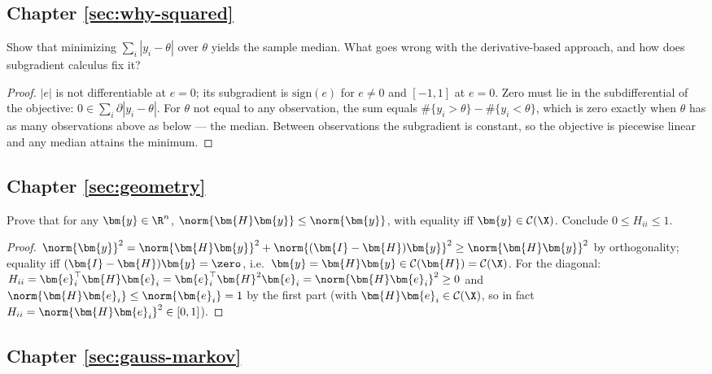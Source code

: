 \subsection*{Chapter \ref{sec:why-squared}}

\begin{exercise}
Show that minimizing $\sum_i |y_i - \theta|$ over $\theta$ yields the sample median. What goes wrong with the derivative-based approach, and how does subgradient calculus fix it?
\end{exercise}
\begin{proof}
$|e|$ is not differentiable at $e = 0$; its subgradient is $\mathrm{sign}(e)$ for $e \neq 0$ and $[-1, 1]$ at $e = 0$. Zero must lie in the subdifferential of the objective: $0 \in \sum_i \partial|y_i - \theta|$. For $\theta$ not equal to any observation, the sum equals $\#\{y_i > \theta\} - \#\{y_i < \theta\}$, which is zero exactly when $\theta$ has as many observations above as below — the median. Between observations the subgradient is constant, so the objective is piecewise linear and any median attains the minimum.
\end{proof}

\subsection*{Chapter \ref{sec:geometry}}

\begin{exercise}
Prove that for any $\bm{y} \in \R^n$, $\norm{\bm{H}\bm{y}} \leq \norm{\bm{y}}$, with equality iff $\bm{y} \in \mathcal{C}(\X)$. Conclude $0 \leq H_{ii} \leq 1$.
\end{exercise}
\begin{proof}
$\norm{\bm{y}}^2 = \norm{\bm{H}\bm{y}}^2 + \norm{(\bm{I}-\bm{H})\bm{y}}^2 \geq \norm{\bm{H}\bm{y}}^2$ by orthogonality; equality iff $(\bm{I}-\bm{H})\bm{y} = \zero$, i.e.\ $\bm{y} = \bm{H}\bm{y} \in \mathcal{C}(\bm{H}) = \mathcal{C}(\X)$. For the diagonal: $H_{ii} = \bm{e}_i^\top \bm{H}\bm{e}_i = \bm{e}_i^\top \bm{H}^2 \bm{e}_i = \norm{\bm{H}\bm{e}_i}^2 \geq 0$ and $\norm{\bm{H}\bm{e}_i} \leq \norm{\bm{e}_i} = 1$ by the first part (with $\bm{H}\bm{e}_i \in \mathcal{C}(\X)$, so in fact $H_{ii} = \norm{\bm{H}\bm{e}_i}^2 \in [0,1]$).
\end{proof}

\subsection*{Chapter \ref{sec:gauss-markov}}

